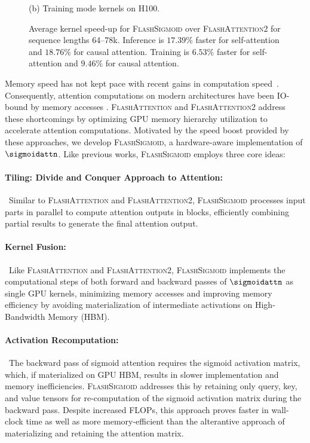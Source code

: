 \begin{figure}[!thbp]
\begin{minipage}{0.45\textwidth}
        \captionsetup{justification=centering} 
        \caption*{(b) Training mode kernels on H100.}
    \end{minipage}
    \caption{
        Average kernel speed-up for \textsc{FlashSigmoid} over \textsc{FlashAttention2} for sequence lengths 64--78k. Inference is ${17.39}\%$ faster for self-attention and ${18.76}\%$ for causal attention. Training is $6.53\%$ faster for self-attention and $9.46\%$ for causal attention. 
    }
    \label{fig:h100-softmax-sigmoid-main-figure}
    \vspace{-0.2cm}
\end{figure}
Memory speed has not kept pace with recent gains in computation speed~\citep{DBLP:journals/micro/Choquette23,DBLP:conf/isca/JouppiYPPABBBBB17,mlx2023}.
Consequently, attention computations on modern architectures have been IO-bound by memory accesses \citep{DBLP:conf/mlsys/IvanovDB0H21}. 
\textsc{FlashAttention} \citep{DBLP:conf/nips/DaoFERR22} and \textsc{FlashAttention2} \citep{DBLP:journals/corr/abs-2307-08691} address these shortcomings by optimizing GPU memory hierarchy utilization to accelerate attention computations. 
Motivated by the speed boost provided by these approaches, we develop \textsc{FlashSigmoid}, a hardware-aware implementation of $\sigmoidattn$.
Like previous works, \textsc{FlashSigmoid} employs three core ideas:
\paragraph{Tiling: Divide and Conquer Approach to Attention:}\ Similar to \textsc{FlashAttention} and \textsc{FlashAttention2}, \textsc{FlashSigmoid} processes input parts in parallel to compute attention outputs in blocks, efficiently combining partial results to generate the final attention output.
\paragraph{Kernel Fusion:}\ Like \textsc{FlashAttention} and \textsc{FlashAttention2}, \textsc{FlashSigmoid} implements the computational steps of both forward and backward passes of $\sigmoidattn$ as single GPU kernels, minimizing memory accesses and improving memory efficiency by avoiding materialization of intermediate activations on High-Bandwidth Memory (HBM).
\paragraph{Activation Recomputation:}\ The backward pass of sigmoid attention requires the sigmoid activation matrix, which, if materialized on GPU HBM, results in slower implementation and memory inefficiencies. \textsc{FlashSigmoid} addresses this by retaining only query, key, and value tensors for re-computation of the sigmoid activation matrix during the backward pass. Despite increased FLOPs, this approach proves faster in wall-clock time as well as more memory-efficient than the alterantive approach of materializing and retaining the attention matrix.

